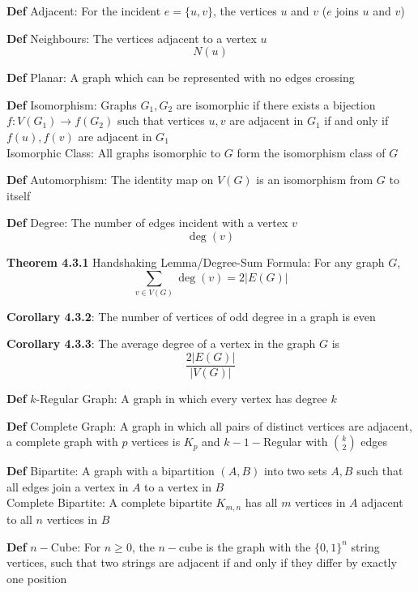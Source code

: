 \documentclass[11pt,notitlepage]{report}
\newcommand{\tbf}[1]{\textbf{#1}}
\begin{document}
\tbf{Def} Adjacent: For the incident $e = \{u, v\}$, the vertices $u$ and $v$ ($e$ joins $u$ and $v$)

\tbf{Def} Neighbours: The vertices adjacent to a vertex $u$
\vspace{-1mm}
$$N(u)$$
\vspace{-8mm}

\tbf{Def} Planar: A graph which can be represented with no edges crossing

\tbf{Def} Isomorphism: Graphs $G_1, G_2$ are isomorphic if there exists a bijection $f: V(G_1) \to f(G_2)$ such that vertices $u, v$ are adjacent in $G_1$ if and only if $f(u), f(v)$ are adjacent in $G_1$\\
\hspace*{5mm} Isomorphic Class: All graphs isomorphic to $G$ form the isomorphism class of $G$

\tbf{Def} Automorphism: The identity map on $V(G)$ is an isomorphism from $G$ to itself

\tbf{Def} Degree: The number of edges incident with a vertex $v$
\vspace{-1mm}
$$\deg(v)$$
\vspace{-8mm}

\tbf{Theorem 4.3.1} Handshaking Lemma/Degree-Sum Formula: For any graph $G$,
$$\sum_{v \in V(G)} \deg(v) = 2|E(G)|$$
\vspace{-5mm}

\tbf{Corollary 4.3.2}: The number of vertices of odd degree in a graph is even

\tbf{Corollary 4.3.3}: The average degree of a vertex in the graph $G$ is
$$\frac{2|E(G)|}{|V(G)|}$$
\vspace{-5mm}

\tbf{Def} $k$-Regular Graph: A graph in which every vertex has degree $k$

\tbf{Def} Complete Graph: A graph in which all pairs of distinct vertices are adjacent, a complete graph with $p$ vertices is $K_p$ and ${k-1}-$Regular with $\binom{k}{2}$ edges

\tbf{Def} Bipartite: A graph with a bipartition $(A, B)$ into two sets $A, B$ such that all edges join a vertex in $A$ to a vertex in $B$\\
\hspace*{5mm} Complete Bipartite: A complete bipartite $K_{m, n}$ has all $m$ vertices in $A$ adjacent to all $n$ vertices in $B$

\tbf{Def} $n-$Cube: For $n\geq 0$, the $n-$cube is the graph with the $\{0,1\}^n$ string vertices, such that two strings are adjacent if and only if they differ by exactly one position
\end{document}
